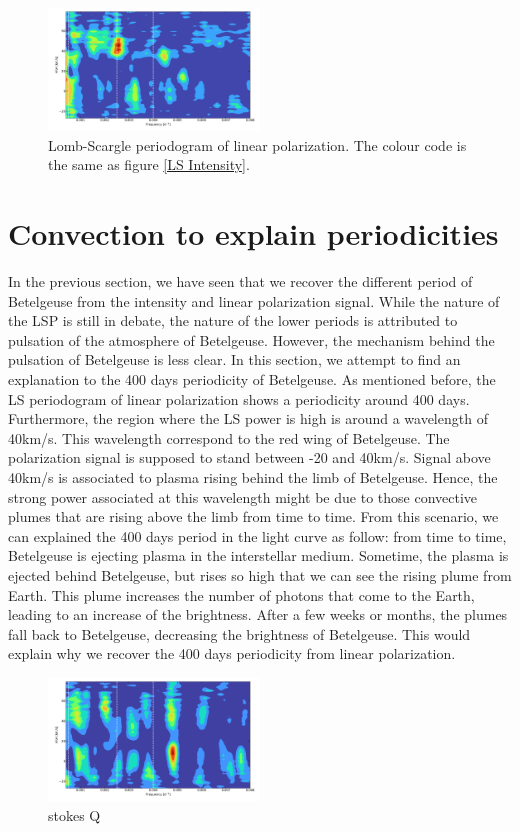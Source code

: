 \documentclass{aa}
\begin{document}
\begin{figure}[!h]
    \centering
    \includegraphics[width=0.5\textwidth]{LS Pl.png}
    \caption{Lomb-Scargle periodogram of linear polarization. The colour code is the same as figure \ref{LS Intensity}. }
    \label{LS Pl}
\end{figure}

\section{Convection to explain periodicities}

In the previous section, we have seen that we recover the different period of Betelgeuse from the intensity and linear polarization signal. While the nature of the LSP is still in debate, the nature of the lower periods is attributed to pulsation of the atmosphere of Betelgeuse. However, the mechanism behind the pulsation of Betelgeuse is less clear. In this section, we attempt to find an explanation to the 400 days periodicity of Betelgeuse. As mentioned before, the LS periodogram of linear polarization shows a periodicity around 400 days. Furthermore, the region where the LS power is high is around a wavelength of 40km/s. This wavelength correspond to the red wing of Betelgeuse. The polarization signal is supposed to stand between -20 and 40km/s. Signal above 40km/s is associated to plasma rising behind the limb of Betelgeuse. Hence, the strong power associated at this wavelength might be due to those convective plumes that are rising above the limb from time to time. From this scenario, we can explained the 400 days period in the light curve as follow: from time to time, Betelgeuse is ejecting plasma in the interstellar medium. Sometime, the plasma is ejected behind Betelgeuse, but rises so high that we can see the rising plume from Earth. This plume increases the number of photons that come to the Earth, leading to an increase of the brightness. After a few weeks or months, the plumes fall back to Betelgeuse, decreasing the brightness of Betelgeuse. This would explain why we recover the 400 days periodicity from linear polarization. 




\begin{figure}[!h]
    \centering
    \includegraphics[width=0.5\textwidth]{LS stokes Q.png}
    \caption{stokes Q}
    \label{LS Q}
\end{figure}
\end{document}
